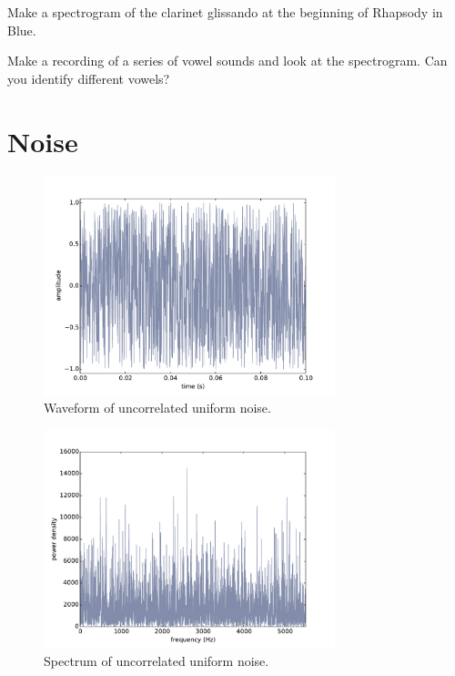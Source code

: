 \documentclass[12pt]{book}
\begin{document}
\begin{exercise}
Make a spectrogram of the clarinet glissando at the beginning of
Rhapsody in Blue.

\end{exercise}

\begin{exercise}
Make a recording of a series of vowel sounds and look at the spectrogram.
Can you identify different vowels?
\end{exercise}



\chapter{Noise}

\begin{figure}
\centerline{\includegraphics[height=2.5in]{figs/whitenoise0.pdf}}
\caption{Waveform of uncorrelated uniform noise.}
\label{fig.noise0}
\end{figure}

\begin{figure}
\centerline{\includegraphics[height=2.5in]{figs/whitenoise1.pdf}}
\caption{Spectrum of uncorrelated uniform noise.}
\label{fig.noise1}
\end{figure}
\end{document}
